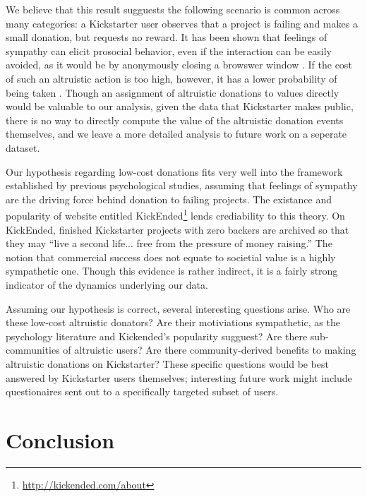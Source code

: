 \documentclass[letterpaper]{article}
\begin{document}
We believe that this result sugguests the following scenario is common across many categories: a Kickstarter user observes that a project is failing and makes a small donation, but requests no reward. It has been shown that feelings of sympathy can elicit prosocial behavior, even if the interaction can be easily avoided, as it would be by anonymously closing a browswer window \cite{eisenberg1989relation}. If the cost of such an altruistic action is too high, however, it has a lower probability of being taken \cite{batson1983influence}. Though an assignment of altruistic donations to values directly would be valuable to our analysis, given the data that Kickstarter makes public, there is no way to directly compute the value of the altruistic donation events themselves, and we leave a more detailed analysis to future work on a seperate dataset.

Our hypothesis regarding low-cost donations fits very well into the framework established by previous psychological studies, assuming that feelings of sympathy are the driving force behind donation to failing projects. The existance and popularity of website entitled KickEnded\footnote{\url{http://kickended.com/about}} lends crediability to this theory. On KickEnded, finished Kickstarter projects with zero backers are archived so that they may ``live a second life... free from the pressure of money raising.'' The notion that commercial success does not equate to societial value is a highly sympathetic one. Though this evidence is rather indirect, it is a fairly strong indicator of the dynamics underlying our data.

Assuming our hypothesis is correct, several interesting questions arise. Who are these low-cost altruistic donators? Are their motiviations sympathetic, as the psychology literature and Kickended's popularity sugguest? Are there sub-communities of altruistic users? Are there community-derived benefits to making altruistic donations on Kickstarter? These specific questions would be best answered by Kickstarter users themselves; interesting future work might include questionaires sent out to a specifically targeted subset of users.

\section{Conclusion}
\end{document}
